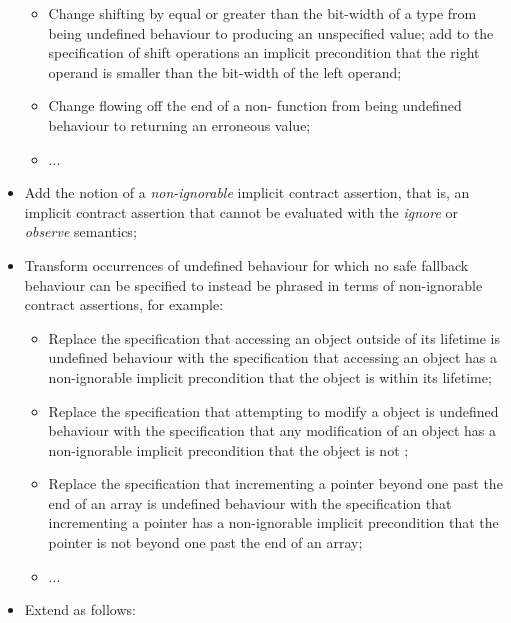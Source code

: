 \begin{itemize}
\begin{itemize}
\item Change shifting by equal or greater than the bit-width of a type from being undefined behaviour to producing an unspecified value; add to the specification of shift operations an implicit precondition that the right operand is smaller than the bit-width of the left operand;
\item Change flowing off the end of a non- function from being undefined behaviour to returning an erroneous value;
\item ...
\end{itemize}
\item Add the notion of a \emph{non-ignorable} implicit contract assertion, that is, an implicit contract assertion that cannot be evaluated with the \emph{ignore} or \emph{observe} semantics;
\item Transform occurrences of undefined behaviour for which no safe fallback behaviour can be specified to instead be phrased in terms of non-ignorable contract assertions, for example:
\begin{itemize}
\item Replace the specification that accessing an object outside of its lifetime is undefined behaviour with the specification that accessing an object has a non-ignorable implicit precondition that the object is within its lifetime;
\item Replace the specification that attempting to modify a  object is undefined behaviour with the specification that any modification of an object has a non-ignorable implicit precondition that the object is not ;
\item Replace the specification that incrementing a pointer beyond one past the end of an array is undefined behaviour with the specification that incrementing a pointer has a non-ignorable implicit precondition that the pointer is not beyond one past the end of an array; 
\item ...
\end{itemize}
\item Extend  as follows:

\phantom{~~} \\
\phantom{~~~~} \\
\phantom{~~~~} \\ 
\phantom{~~~~}\added{\tcode{,}} \\
\phantom{~~~~} \\
\phantom{~~}\tcode{\};}


\end{itemize}
